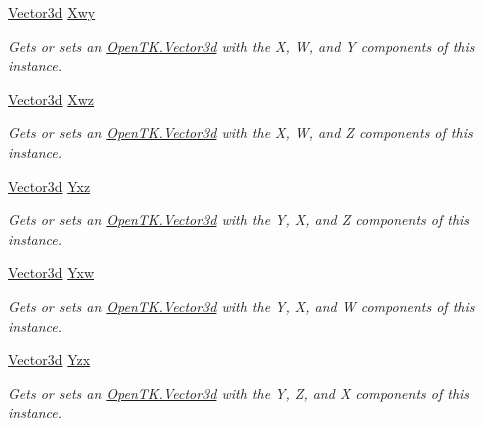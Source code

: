 \begin{DoxyCompactItemize}
\hyperlink{struct_open_t_k_1_1_vector3d}{Vector3d} \hyperlink{struct_open_t_k_1_1_vector4d_a0573f433a094655e758c3b6286069936}{Xwy}
\begin{DoxyCompactList}\small\item\em Gets or sets an \hyperlink{struct_open_t_k_1_1_vector3d}{Open\-T\-K.\-Vector3d} with the X, W, and Y components of this instance. \end{DoxyCompactList}\item 
\hyperlink{struct_open_t_k_1_1_vector3d}{Vector3d} \hyperlink{struct_open_t_k_1_1_vector4d_a16554fa9c3a037fcc74dab63f5e1879f}{Xwz}
\begin{DoxyCompactList}\small\item\em Gets or sets an \hyperlink{struct_open_t_k_1_1_vector3d}{Open\-T\-K.\-Vector3d} with the X, W, and Z components of this instance. \end{DoxyCompactList}\item 
\hyperlink{struct_open_t_k_1_1_vector3d}{Vector3d} \hyperlink{struct_open_t_k_1_1_vector4d_a720d10f2dceaf03b22fb07c2eb71d22e}{Yxz}
\begin{DoxyCompactList}\small\item\em Gets or sets an \hyperlink{struct_open_t_k_1_1_vector3d}{Open\-T\-K.\-Vector3d} with the Y, X, and Z components of this instance. \end{DoxyCompactList}\item 
\hyperlink{struct_open_t_k_1_1_vector3d}{Vector3d} \hyperlink{struct_open_t_k_1_1_vector4d_a90b3743157ec0930db8459bb85f1e348}{Yxw}
\begin{DoxyCompactList}\small\item\em Gets or sets an \hyperlink{struct_open_t_k_1_1_vector3d}{Open\-T\-K.\-Vector3d} with the Y, X, and W components of this instance. \end{DoxyCompactList}\item 
\hyperlink{struct_open_t_k_1_1_vector3d}{Vector3d} \hyperlink{struct_open_t_k_1_1_vector4d_ab54c9a4d89cf6b492e5a24a1b1db6b50}{Yzx}
\begin{DoxyCompactList}\small\item\em Gets or sets an \hyperlink{struct_open_t_k_1_1_vector3d}{Open\-T\-K.\-Vector3d} with the Y, Z, and X components of this instance. \end{DoxyCompactList}\item 

\end{DoxyCompactItemize}
